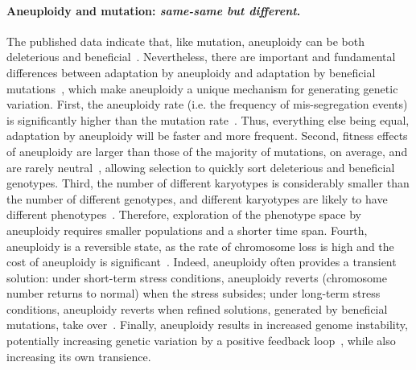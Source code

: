 \documentclass[12pt]{extarticle}
\begin{document}
\paragraph*{Aneuploidy and mutation: \textit{same-same but different}.}
The published data indicate that, like mutation, aneuploidy can be both deleterious and beneficial~\citep{Pavelka2010, Sheltzer2011}.
Nevertheless, there are important and fundamental differences between adaptation by aneuploidy
and adaptation by beneficial mutations~\citep{Yona2015}, which make aneuploidy a unique mechanism for generating genetic
variation.
First, the aneuploidy rate (i.e. the frequency of mis-segregation events) is significantly higher than the
mutation rate~\citep{Santaguida2015review}.
Thus, everything else being equal, adaptation by aneuploidy will be faster and more frequent.
Second, fitness effects of aneuploidy are larger than those of the majority of mutations, on average, and are rarely
neutral~\citep{Pavelka2010, Yona2012, Sunshine2015}, allowing selection to quickly sort deleterious and beneficial genotypes.
Third, the number of different karyotypes is considerably smaller than the number of different genotypes, and different karyotypes are likely to have different phenotypes~\citep{Pavelka2010}.
Therefore, exploration of the phenotype space by aneuploidy requires smaller populations and a shorter time span.
Fourth, aneuploidy is a reversible state, as the rate of chromosome loss is high and the cost of aneuploidy is significant~\citep{Niwa2006}.
Indeed, aneuploidy often provides a transient solution: under short-term stress conditions, aneuploidy reverts (chromosome number returns to normal) when the stress subsides; under long-term stress conditions, aneuploidy reverts when refined solutions, generated by beneficial mutations, take over~\citep{Yona2012}.
Finally, aneuploidy results in increased genome instability, potentially increasing genetic variation by a positive feedback loop~\citep{Rancati2013, Bouchonville2009, Zhu2012}, while also increasing its own transience.
\end{document}
